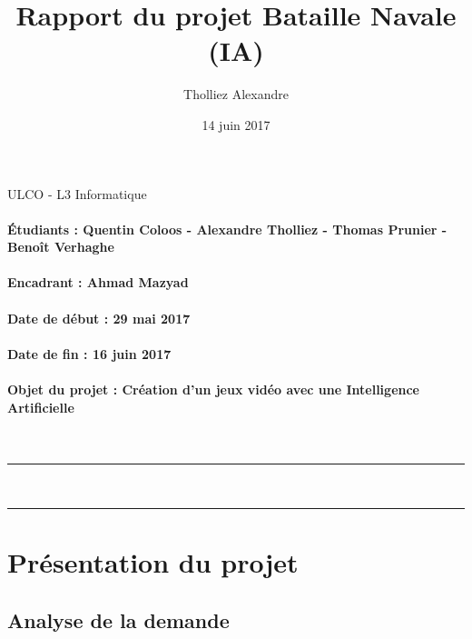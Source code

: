 \documentclass[a4paper,oneside]{article}
\title{Rapport du projet Bataille Navale (IA)}
\author{Tholliez Alexandre}
\date{14 juin 2017}
\begin{document}

\thispagestyle{empty}

\Large
ULCO - L3 Informatique

\vfill 

\Huge
\begin{center}
\@title
\end{center}

\normalsize

\vfill 

\paragraph{Étudiants : Quentin Coloos - Alexandre Tholliez - Thomas Prunier - Benoît Verhaghe }

\paragraph{Encadrant : Ahmad Mazyad}

\paragraph{Date de début : 29 mai 2017 }

\paragraph{Date de fin : 16 juin 2017 }

\paragraph{Objet du projet : Création d'un jeux vidéo avec une Intelligence Artificielle }

~

\vfill 

\noindent\rule{\linewidth}{0.5pt}

\tableofcontents

~\\
\noindent\rule{\linewidth}{0.5pt}

\clearpage


\section{Présentation du projet}


\subsection{Analyse de la demande}
\end{document}

